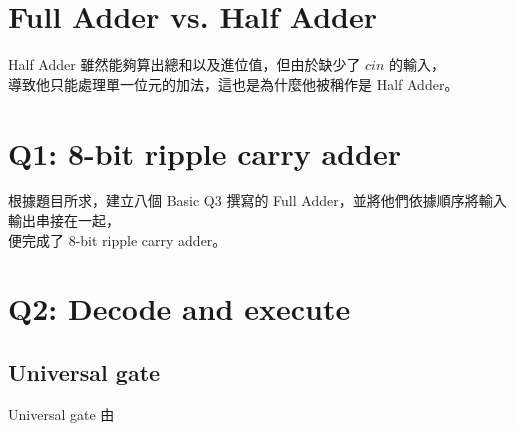\documentclass[10.5pt,compsoc,UTF8]{CjC}
\theoremstyle{mystyle}
\begin{document}
\section{Full Adder vs. Half Adder}

Half Adder 雖然能夠算出總和以及進位值，但由於缺少了 $cin$  的輸入，\\
導致他只能處理單一位元的加法，這也是為什麼他被稱作是 Half Adder。

\section{Q1: 8-bit ripple carry adder}

根據題目所求，建立八個 Basic Q3 撰寫的 Full Adder，並將他們依據順序將輸入輸出串接在一起，\\
便完成了 8-bit ripple carry adder。

\section{Q2: Decode and execute}

\subsection{Universal gate}
Universal gate 由 $$
\end{document}
